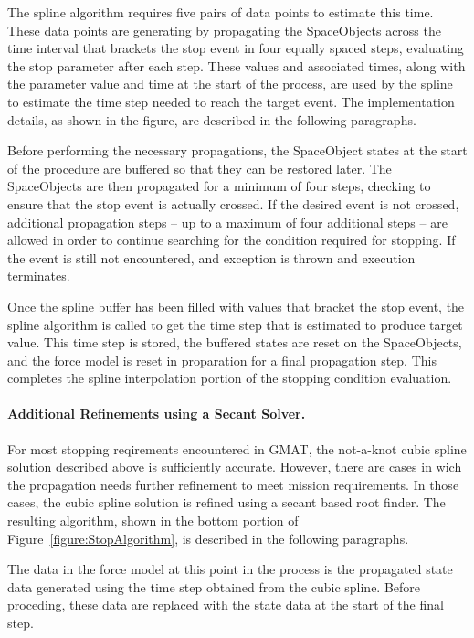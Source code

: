The spline algorithm requires five pairs of data points to estimate this time.  These data points
are generating by propagating the SpaceObjects across the time interval that brackets the stop
event in four equally spaced steps, evaluating the stop parameter after each step.  These values
and associated times, along with the parameter value and time at the start of the process, are used
by the spline to estimate the time step needed to reach the target event.  The implementation
details, as shown in the figure, are described in the following paragraphs.

Before performing the necessary propagations, the SpaceObject states at the start of the procedure
are buffered so that they can be restored later.  The SpaceObjects are then propagated for a
minimum of four steps, checking to ensure that the stop event is actually crossed.  If the desired
event is not crossed, additional propagation steps -- up to a maximum of four additional steps --
are allowed in order to continue searching for the condition required for stopping.  If the event
is still not encountered, and exception is thrown and execution terminates.

Once the spline buffer has been filled with values that bracket the stop event, the spline algorithm
is called to get the time step that is estimated to produce target value.  This time step is stored,
the buffered states are reset on the SpaceObjects, and the force model is reset in proparation for a
final propagation step.  This completes the spline interpolation portion of the stopping condition
evaluation.

\paragraph{Additional Refinements using a Secant Solver.}  For most stopping reqirements encountered
in GMAT, the not-a-knot cubic spline solution described above is sufficiently accurate.  However,
there are cases in wich the propagation needs further refinement to meet mission requirements.  In
those cases, the cubic spline solution is refined using a secant based root finder.  The resulting
algorithm, shown in the bottom portion of Figure~\ref{figure:StopAlgorithm}, is described in the
following paragraphs.

The data in the force model at this point in the process is the propagated state data generated
using the time step obtained from the cubic spline.  Before proceding, these data are replaced with
the state data at the start of the final step.

